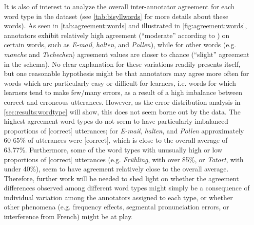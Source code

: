 		It is also of interest to analyze the overall inter-annotator agreement for each word type in the dataset (see \cref{tab:bisyllwords} for more details about these words). 
		As seen in \cref{tab:agreement:words} and illustrated in \cref{fig:agreement:words}, 
		annotators exhibit relatively high agreement (``moderate'' according to \cite{Landis1977}) on certain words, such as \textit{E-mail}, \textit{halten}, and \textit{Pollen}), while for other words (e.g. \textit{manche} and \textit{Tschechen}) agreement values are closer to chance (``slight'' agreement in the \citeauthor{Landis1977} schema). 
		No clear explanation for these variations readily presents itself, but one reasonable hypothesis might be that annotators may agree more often for words which are particularly easy or difficult for learners, i.e. words for which learners tend to make few/many errors, as a result of a high imbalance between correct and erroneous utterances. However, as the error distribution analysis in \cref{sec:results:wordtype} will show, this does not seem borne out by the data. The highest-agreement word types do not seem to have particularly imbalanced proportions of [correct] utterances; for \textit{E-mail}, \textit{halten}, and \textit{Pollen} approximately 60-65\% of utterances were [correct], which is close to the overall average of 63.77\%. Furthermore, some of the word types with unusually high or low proportions of [correct] utterances (e.g. \textit{Frühling}, with over 85\%, or \textit{Tatort}, with under 40\%), seem to have agreement relatively close to the overall average. Therefore, further work will be needed to shed light on whether the agreement differences observed among different word types might simply be a consequence of individual variation among the annotators assigned to each type, or whether other phenomena (e.g. frequency effects, segmental pronunciation errors, or interference from French) might be at play.
		

